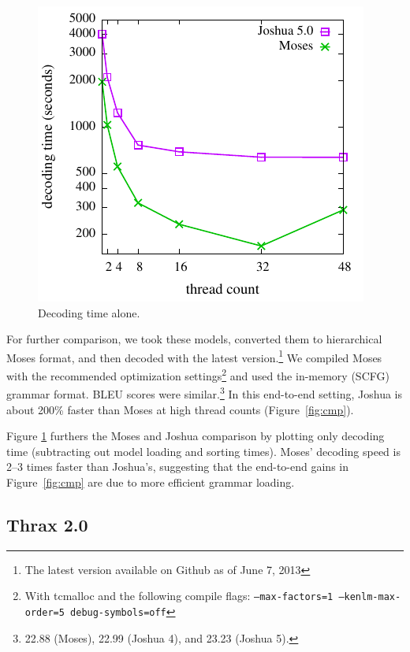 \documentclass[11pt]{article}
\begin{document}
\begin{figure}[!t]
  \begin{center}
    \includegraphics[width=0.99\linewidth]{plots/decoding-only.pdf}
  \end{center}
  \caption{Decoding time alone.}
  \label{fig:decoding-only}
\end{figure}

For further comparison, we took these models, converted them to
hierarchical Moses format, and then decoded with the latest
version.\footnote{The latest version available on Github as of June 7,
  2013} We compiled Moses with the recommended optimization
settings\footnote{With tcmalloc and the following compile flags:
  \texttt{--max-factors=1 --kenlm-max-order=5 debug-symbols=off}} and
used the in-memory (SCFG) grammar format.  BLEU scores were
similar.\footnote{22.88 (Moses), 22.99 (Joshua 4), and 23.23 (Joshua
  5).}  In this end-to-end setting, Joshua is about 200\% faster than
Moses at high thread counts (Figure~\ref{fig:cmp}).

Figure \ref{fig:decoding-only} furthers the Moses and Joshua
comparison by plotting only decoding time (subtracting
out model loading and sorting times).  Moses' decoding speed is 2--3
times faster than Joshua's, suggesting that the end-to-end gains in
Figure~\ref{fig:cmp} are due to more efficient grammar loading.

\subsection{Thrax 2.0}
\label{sec:thrax}
\end{document}
